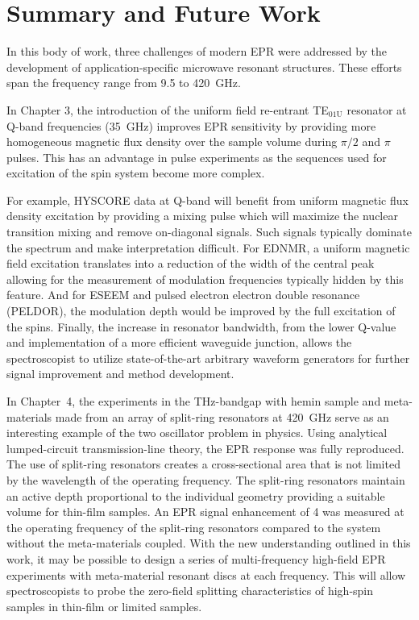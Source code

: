 \chapter[Summary and Future Work]{Summary and Future Work}

In this body of work, three challenges of modern EPR were addressed by the development of application-specific microwave resonant structures. These efforts span the frequency range from 9.5 to 420~GHz.

In Chapter 3, the introduction of the uniform field re-entrant TE$_{\text{01U}}$ resonator at Q-band frequencies (35~GHz) improves EPR sensitivity by providing more homogeneous magnetic flux density over the sample volume during $\pi/2$ and $\pi$ pulses. This has an advantage in pulse experiments as the sequences used for excitation of the spin system become more complex. 

For example, HYSCORE data at Q-band will benefit from uniform magnetic flux density excitation by providing a mixing pulse which will maximize the nuclear transition mixing and remove on-diagonal signals. \cite{Doorslaer2007,Harmer2009} Such signals typically dominate the spectrum and make interpretation difficult. For EDNMR, a uniform magnetic field excitation translates into a reduction of the width of the central peak allowing for the measurement of modulation frequencies typically hidden by this feature. \cite{NicholasCox2013} And for ESEEM and pulsed electron electron double resonance (PELDOR), the modulation depth would be improved by the full excitation of the spins. Finally, the increase in resonator bandwidth, from the lower Q-value and implementation of a more efficient waveguide junction, allows the spectroscopist to utilize state-of-the-art arbitrary waveform generators for further signal improvement and method development. \cite{DOLL201327,dSegawa2015,SPINDLER201730,WILI201826,PRISNER201998}

In Chapter~4, the experiments in the THz-bandgap with hemin sample and meta-materials made from an array of split-ring resonators at 420~GHz serve as an interesting example of the two oscillator problem in physics. Using analytical lumped-circuit transmission-line theory, the EPR response was fully reproduced. The use of split-ring resonators creates a cross-sectional area that is not limited by the wavelength of the operating frequency. The split-ring resonators maintain an active depth proportional to the individual geometry providing a suitable volume for thin-film samples. An EPR signal enhancement of 4 was measured at the operating frequency of the split-ring resonators compared to the system without the meta-materials coupled. With the new understanding outlined in this work, it may be possible to design a series of multi-frequency high-field EPR experiments with meta-material resonant discs at each frequency. This will allow spectroscopists to probe the zero-field splitting characteristics of high-spin samples in thin-film or limited samples.


